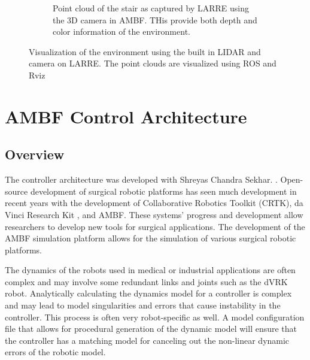 \begin{figure}[h]
\begin{subfigure}{\linewidth}
        \caption{Point cloud of the stair as captured by LARRE using the 3D camera in AMBF. THis provide both depth and color information of the environment.}
        \label{fig:DEPTH}
    \end{subfigure}
   \caption[LIDAR built into LARREs hip]{Visualization of the environment using the built in LIDAR and camera on LARRE. The point clouds are visualized using ROS and Rviz}
   \label{fig:sensors}
\end{figure}
 
 
 
 \section{AMBF Control Architecture}
 \label{sec:controlarchitecture}
 
 \subsection{Overview}
 The controller architecture was developed with Shreyas Chandra Sekhar. \cite{poster}. Open-source development of surgical robotic platforms has seen much development in recent years with the development of Collaborative Robotics Toolkit (CRTK)\cite{su2020collaborative}, da Vinci Research Kit \cite{d2021accelerating}, and AMBF. These systems' progress and development allow researchers to develop new tools for surgical applications. The development of the  AMBF simulation platform allows for the simulation of various surgical robotic platforms. 

The dynamics of the robots used in medical or industrial applications are often complex and may involve some redundant links and joints such as the dVRK robot\cite{wang2019convex}. Analytically calculating the dynamics model for a controller is complex and may lead to model singularities and errors that cause instability in the controller. This process is often very robot-specific as well. A model configuration file that allows for procedural generation of the dynamic model will ensure that the controller has a matching model for canceling out the non-linear dynamic errors of the robotic model.

